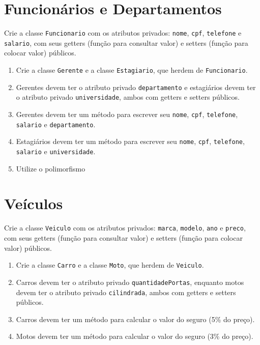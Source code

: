 \documentclass{article}
\begin{document}
\section{Funcionários e Departamentos}
Crie a classe \texttt{Funcionario} com os atributos privados: \texttt{nome}, \texttt{cpf}, \texttt{telefone} e 
\texttt{salario}, com seus getters (função para consultar valor) e setters (função para colocar valor) públicos.

\begin{enumerate}
    \item Crie a classe \texttt{Gerente} e a classe \texttt{Estagiario}, que herdem de \texttt{Funcionario}. 
    \item Gerentes devem ter o atributo privado \texttt{departamento} e estagiários devem ter o atributo privado \texttt{universidade}, ambos com getters e setters públicos.
    \item Gerentes devem ter um método para escrever seu  \texttt{nome}, \texttt{cpf}, \texttt{telefone}, 
\texttt{salario} e \texttt{departamento}.
    \item Estagiários devem ter um método para escrever seu  \texttt{nome}, \texttt{cpf}, \texttt{telefone}, 
\texttt{salario} e \texttt{universidade}.
\item Utilize o polimorfismo
   
\end{enumerate}


\section{Veículos}
Crie a classe \texttt{Veiculo} com os atributos privados: \texttt{marca}, \texttt{modelo}, \texttt{ano} e 
\texttt{preco}, com seus getters (função para consultar valor) e setters (função para colocar valor) públicos.

\begin{enumerate}
    \item Crie a classe \texttt{Carro} e a classe \texttt{Moto}, que herdem de \texttt{Veiculo}. 
    \item Carros devem ter o atributo privado \texttt{quantidadePortas}, enquanto motos devem ter o atributo privado \texttt{cilindrada}, ambos com getters e setters públicos.
    \item Carros devem ter um método para calcular o valor do seguro (5\% do preço).
    \item Motos devem ter um método para calcular o valor do seguro (3\% do preço).
    
\end{enumerate}
\end{document}
